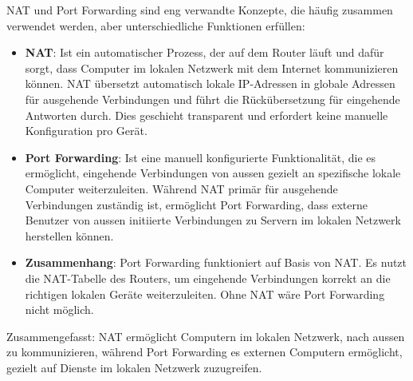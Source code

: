 \begin{myremark}
\gls{NAT} und Port Forwarding sind eng verwandte Konzepte, die häufig zusammen verwendet werden, aber unterschiedliche Funktionen erfüllen:

\begin{itemize}
	\item \textbf{\gls{NAT}}: Ist ein automatischer Prozess, der auf dem Router läuft und dafür sorgt, dass Computer im lokalen Netzwerk mit dem Internet kommunizieren können. \gls{NAT} übersetzt automatisch lokale \gls{IP}-Adressen in globale Adressen für ausgehende Verbindungen und führt die Rückübersetzung für eingehende Antworten durch. Dies geschieht transparent und erfordert keine manuelle Konfiguration pro Gerät.
	
	\item \textbf{Port Forwarding}: Ist eine manuell konfigurierte Funktionalität, die es ermöglicht, eingehende Verbindungen von aussen gezielt an spezifische lokale Computer weiterzuleiten. Während \gls{NAT} primär für ausgehende Verbindungen zuständig ist, ermöglicht Port Forwarding, dass externe Benutzer von aussen initiierte Verbindungen zu Servern im lokalen Netzwerk herstellen können.
	
	\item \textbf{Zusammenhang}: Port Forwarding funktioniert auf Basis von \gls{NAT}. Es nutzt die \gls{NAT}-Tabelle des Routers, um eingehende Verbindungen korrekt an die richtigen lokalen Geräte weiterzuleiten. Ohne \gls{NAT} wäre Port Forwarding nicht möglich.
\end{itemize}

Zusammengefasst: \gls{NAT} ermöglicht Computern im lokalen Netzwerk, nach aussen zu kommunizieren, während Port Forwarding es externen Computern ermöglicht, gezielt auf Dienste im lokalen Netzwerk zuzugreifen.
\end{myremark}